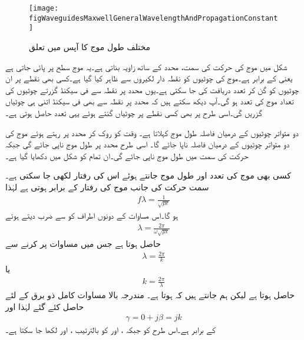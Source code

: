 \begin{figure}
\centering
\texttt{[image: figWaveguidesMaxwellGeneralWavelengthAndPropagationConstant]}
\caption{مختلف طول موج کا آپس میں تعلق}
\label{شکل_مویج_مختلف_طول_موج}
\end{figure}

شکل  میں موج کی حرکت کی سمت،  محدد کے ساتھ  زاویہ بناتی ہے۔یہ موج  سطح پر پائی جاتی ہے یعنی  کے برابر ہے۔موج کی چوٹیوں کو نقطہ دار لکیروں سے ظاہر کیا گیا ہے۔کسی بھی نقطے پر ان چوٹیوں کو گن کر تعدد دریافت کی جا سکتی ہے۔یوں  محدد پر نقطہ  سے فی سیکنڈ گزرتے چوٹیوں کی تعداد  موج کی تعدد  ہو گی۔آپ دیکھ سکتے ہیں کہ  محدد پر نقطہ  سے بھی  فی سیکنڈ اتنی ہی چوٹیاں گزریں گی۔اسی طرح  پر بھی کسی نقطے پر چوٹیاں گنتے ہوئے  یہی تعدد حاصل ہوتی ہے۔

دو متواتر چوٹیوں کے درمیان فاصلہ طول موج کہلاتا ہے۔ وقت  کو روک کر  محدد پر رہتے ہوئے موج کی دو متواتر چوٹیوں کے درمیان فاصلہ  ناپا جائے گا۔ اسی طرح  محدد پر طول موج  ناپی جائے گی جبکہ حرکت کی سمت میں طول موج  ناپی جائے گی۔ان تمام کو شکل  میں دکھایا گیا ہے۔

کسی بھی موج کی تعدد  اور طول موج   جانتے ہوئے اس کی رفتار  لکھی جا سکتی ہے۔سمت حرکت کی جانب موج کی رفتار  کے برابر ہوتی ہے لہٰذا
\begin{align}
f \lambda=\frac{1}{\sqrt{\mu \epsilon}}
\end{align}
ہو گا۔اس مساوات کے دونوں اطراف کو  سے ضرب دیتے ہوئے
\begin{align}
\lambda=\frac{2\pi}{\omega \sqrt{\mu \epsilon}}
\end{align}
حاصل ہوتا ہے جس میں مساوات  پر کرنے سے
\begin{align}
\lambda=\frac{2\pi}{k}
\end{align}
یا
\begin{align}\label{مساوات_مویج_گمکی_عمومی_ڈ}
k=\frac{2\pi}{\lambda}
\end{align}
حاصل ہوتا ہے لیکن ہم جانتے ہیں کہ  ہوتا ہے۔ مندرجہ بالا مساوات کامل ذو برق  کے لئے حاصل کئے گئے لہٰذا   اور
\begin{align}
\gamma=0+j\beta=j k
\end{align} 
کے برابر ہے۔اس طرح  کو  جبکہ ،  اور  کو بالترتیب ، اور  لکھا جا سکتا ہے۔

